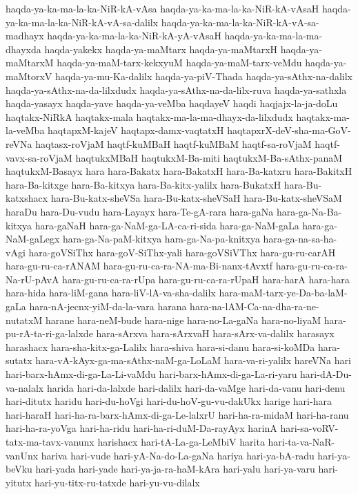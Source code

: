{haqda-ya-ka-ma-la-ka-NiR-kA-vAsa
haqda-ya-ka-ma-la-ka-NiR-kA-vAsaH
haqda-ya-ka-ma-la-ka-NiR-kA-vA-sa-dalilx
haqda-ya-ka-ma-la-ka-NiR-kA-vA-sa-madhayx
haqda-ya-ka-ma-la-ka-NiR-kA-yA-vAsaH
haqda-ya-ka-ma-la-ma-dhayxda
haqda-yakekx
haqda-ya-maMtarx
haqda-ya-maMtarxH
haqda-ya-maMtarxM
haqda-ya-maM-tarx-kekxyuM
haqda-ya-maM-tarx-veMdu
haqda-ya-maMtorxV
haqda-ya-mu-Ka-dalilx
haqda-ya-piV-Thada
haqda-ya-sAthx-na-dalilx
haqda-ya-sAthx-na-da-lilxdudx
haqda-ya-sAthx-na-da-lilx-ruva
haqda-ya-sathxla
haqda-yasayx
haqda-yave
haqda-ya-veMba
haqdayeV
haqdi
haqjajx-la-ja-doLu
haqtakx-NiRkA
haqtakx-mala
haqtakx-ma-la-ma-dhayx-da-lilxdudx
haqtakx-ma-la-veMba
haqtapxM-kajeV
haqtapx-damx-vaqtatxH
haqtapxrX-deV-sha-ma-GoV-reVNa
haqtasx-roVjaM
haqtf-kuMBaH
haqtf-kuMBaM
haqtf-sa-roVjaM
haqtf-vavx-sa-roVjaM
haqtukxMBaH
haqtukxM-Ba-miti
haqtukxM-Ba-sAthx-panaM
haqtukxM-Basayx
hara
hara-Bakatx
hara-BakatxH
hara-Ba-katxru
hara-BakitxH
hara-Ba-kitxge
hara-Ba-kitxya
hara-Ba-kitx-yalilx
hara-BukatxH
hara-Bu-katxshacx
hara-Bu-katx-sheVSa
hara-Bu-katx-sheVSaH
hara-Bu-katx-sheVSaM
haraDu
hara-Du-vudu
hara-Layayx
hara-Te-gA-rara
hara-gaNa
hara-ga-Na-Ba-kitxya
hara-gaNaH
hara-ga-NaM-ga-LA-ca-ri-sida
hara-ga-NaM-gaLa
hara-ga-NaM-gaLegx
hara-ga-Na-paM-kitxya
hara-ga-Na-pa-knitxya
hara-ga-na-sa-ha-vAgi
hara-goVSiThx
hara-goV-SiThx-yali
hara-goVSiVThx
hara-gu-ru-carAH
hara-gu-ru-ca-rANAM
hara-gu-ru-ca-ra-NA-ma-Bi-nanx-tAvxtf
hara-gu-ru-ca-ra-Na-rU-pAvA
hara-gu-ru-ca-ra-rUpa
hara-gu-ru-ca-ra-rUpaH
hara-harA
hara-hara
hara-hida
hara-liM-gana
hara-liV-lA-va-sha-dalilx
hara-maM-tarx-ye-Da-ba-laM-gaLa
hara-nA-jecnx-yiM-da-la-vara
harana
hara-na-lAM-Ca-na-dha-ra-ne-nutatxM
harane
hara-neM-bude
hara-nige
hara-no-La-gaNa
hara-no-liyaM
hara-pu-rA-ta-ri-ga-lalxde
hara-sArxva
hara-sArxvaH
hara-sArx-va-dalilx
harasayx
harashacx
hara-sha-kitx-ga-Lalilx
hara-shiva
hara-si-danu
hara-si-koMDa
hara-sutatx
hara-vA-kAyx-ga-ma-sAthx-naM-ga-LoLaM
hara-va-ri-yalilx
hareVNa
hari
hari-barx-hAmx-di-ga-La-Li-vaMdu
hari-barx-hAmx-di-ga-La-ri-yaru
hari-dA-Du-va-nalalx
harida
hari-da-lalxde
hari-dalilx
hari-da-vaMge
hari-da-vanu
hari-denu
hari-ditutx
haridu
hari-du-hoVgi
hari-du-hoV-gu-vu-dakUkx
harige
hari-hara
hari-haraH
hari-ha-ra-barx-hAmx-di-ga-Le-lalxrU
hari-ha-ra-midaM
hari-ha-ranu
hari-ha-ra-yoVga
hari-ha-ridu
hari-ha-ri-duM-Da-rayAyx
harinA
hari-sa-voRV-tatx-ma-tavx-vanunx
harishacx
hari-tA-La-ga-LeMbiV
harita
hari-ta-va-NaR-vanUnx
hariva
hari-vude
hari-yA-Na-do-La-gaNa
hariya
hari-ya-bA-radu
hari-ya-beVku
hari-yada
hari-yade
hari-ya-ja-ra-haM-kAra
hari-yalu
hari-ya-varu
hari-yitutx
hari-yu-titx-ru-tatxde
hari-yu-vu-dilalx
}
